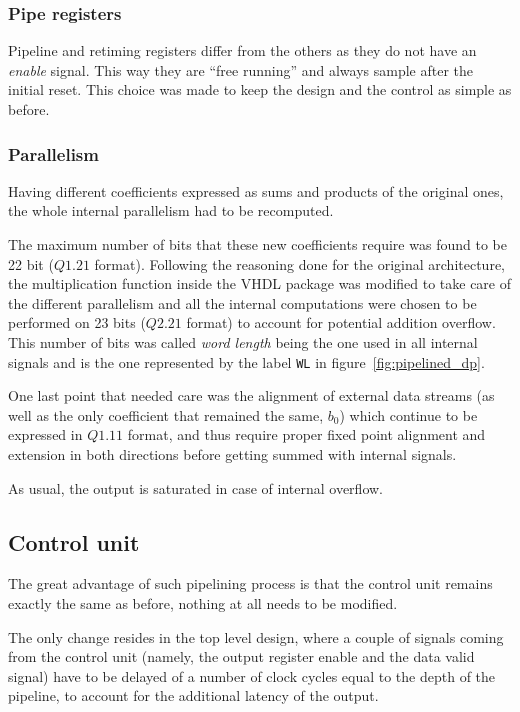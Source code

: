 \documentclass[a4paper]{article}
\begin{document}
\subsubsection{Pipe registers}
Pipeline and retiming registers differ from the others as they do not have an \emph{enable} signal. This way they are ``free running'' and always sample after the initial reset. 
This choice was made to keep the design and the control as simple as before.

\subsubsection{Parallelism}
Having different coefficients expressed as sums and products of the original ones, the whole internal parallelism had to be recomputed. 

The maximum number of bits that these new coefficients require was found to be 22 bit ($Q1.21$ format). Following the reasoning done for the original architecture, the multiplication function inside the VHDL package was modified to take care of the different parallelism and all the internal computations were chosen to be performed on 23 bits ($Q2.21$ format) to account for potential addition overflow. This number of bits was called \emph{word length} being the one used in all internal signals and is the one represented by the label \texttt{WL} in figure~\ref{fig:pipelined_dp}.

One last point that needed care was the alignment of external data streams (as well as the only coefficient that remained the same, $b_0$) which continue to be expressed in $Q1.11$ format, and thus require proper fixed point alignment and extension in both directions before getting summed with internal signals. 

As usual, the output is saturated in case of internal overflow.

\subsection{Control unit}
The great advantage of such pipelining process is that the control unit remains exactly the same as before, nothing at all needs to be modified.

The only change resides in the top level design, where a couple of signals coming from the control unit (namely, the output register enable and the data valid signal) have to be delayed of a number of clock cycles equal to the depth of the pipeline, to account for the additional latency of the output. 
\end{document}
